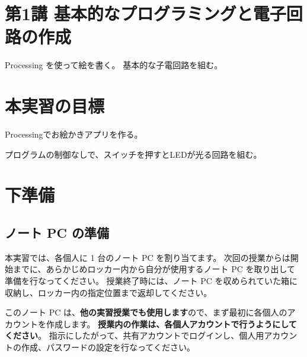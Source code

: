 \documentclass[11pt,a4paper]{jarticle}
\begin{document}
\section*{\LARGE{第1講 基本的なプログラミングと電子回路の作成}}
Processing を使って絵を書く。
基本的な子電回路を組む。

\section{本実習の目標}
Processingでお絵かきアプリを作る。

プログラムの制御なしで、スイッチを押すとLEDが光る回路を組む。

\section{下準備}
\subsection*{ノート PC の準備}
本実習では、各個人に 1 台のノート PC を割り当てます。
次回の授業からは開始までに、あらかじめロッカー内から自分が使用するノート PC を取り出して準備を行なってください。
授業終了時には、ノート PC を収められていた箱に収納し、ロッカー内の指定位置まで返却してください。

このノート PC は、\textbf{他の実習授業でも使用します}ので、まず最初に各個人のアカウントを作成します。
\textbf{授業内の作業は、各個人アカウントで行うようにしてください}。
指示にしたがって、共有アカウントでログインし、個人用アカウントの作成、パスワードの設定を行なってください。
\end{document}
